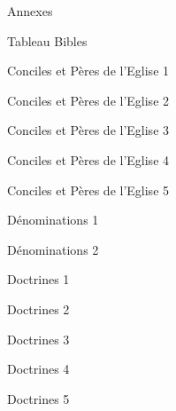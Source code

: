 \documentclass[11pt]{book}
\begin{document}
\makeatletter
\def\@oddhead{\hfil}
\def\@evenhead{\hfil}
\def\@oddfoot{{\small\hfil\thepage\hfil}}
\def\@evenfoot{{\small\hfil\thepage\hfil}}
\makeatother
\clearpage
\begin{center}Annexes\end{center}\clearpage
\clearpage
\clearpage
\clearpage
\clearpage
\begin{center}Tableau Bibles\end{center}\clearpage
\clearpage
\begin{center}Conciles et Pères de l'Eglise 1\end{center}\clearpage
\begin{center}Conciles et Pères de l'Eglise 2\end{center}\clearpage
\begin{center}Conciles et Pères de l'Eglise 3\end{center}\clearpage
\begin{center}Conciles et Pères de l'Eglise 4\end{center}\clearpage
\begin{center}Conciles et Pères de l'Eglise 5\end{center}\clearpage
\clearpage
\begin{center}Dénominations 1\end{center}\clearpage
\begin{center}Dénominations 2\end{center}\clearpage
\clearpage
\begin{center}Doctrines 1\end{center}\clearpage
\begin{center}Doctrines 2\end{center}\clearpage
\begin{center}Doctrines 3\end{center}\clearpage
\begin{center}Doctrines 4\end{center}\clearpage
\begin{center}Doctrines 5\end{center}\clearpage
\end{document}
